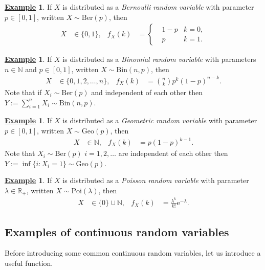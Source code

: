 \documentclass[12pt]{book}
\numberwithin{equation}{chapter}
\theoremstyle{plain}
\numberwithin{theorem}{section}
\theoremstyle{definition}
\newtheorem{example}[theorem]{\underline{Example}}
\numberwithin{exercise}{chapter}
\newcommand{\<}{\langle}
\renewcommand{\>}{\rangle}
\renewcommand{\(}{\left(}
\renewcommand{\)}{\right)}
\renewcommand{\[}{\left[}
\renewcommand{\]}{\right]}
\newcommand\Rb{\mathds{R}}
\newcommand\Nb{\mathds{N}}
\newcommand\lam{\lambda}
\newcommand\ee{\mathrm{e}}
\begin{document}
\begin{example}
\label{ex:bernoulli}
If $X$ is distributed as a \emph{Bernoulli random variable} with parameter $p \in [0,1]$, written $X \sim \text{Ber}(p)$, then
\begin{align}
X
	&\in \{ 0 , 1 \} , &
f_X(k)
	&=	\left\{ \begin{aligned}
			& 1-p & k=0 , \\
			& p & k=1 .
			\end{aligned} \right. 
\end{align}
\end{example}

\begin{example}
\label{ex:binomial}
If $X$ is distributed as a \emph{Binomial random variable} with parameters $n \in \Nb$ and $p \in [0,1]$, written $X \sim \text{Bin}(n,p)$, then
\begin{align}
X
	&\in \{0,1,2,\ldots,n\} , &
f_X(k)
	&=	\binom{n}{k} p^k (1-p)^{n-k} .
\end{align}
Note that if $X_i \sim \text{Ber}(p)$ and independent of each other then $Y := \sum_{i=1}^n X_i \sim \text{Bin}(n,p)$.
\end{example}

\begin{example}
\label{ex:geometric}
If $X$ is distributed as a \emph{Geometric random variable} with parameter $p \in [0,1]$, written $X \sim \text{Geo}(p)$, then
\begin{align}
X
	&\in \Nb , &
f_X(k)
	&=	p (1-p)^{k-1} .
\end{align}
Note that $X_i \sim \text{Ber}(p)$ $i=1,2,\ldots$ are independent of each other then $Y := \inf\{ i : X_i = 1 \} \sim \text{Geo}(p)$.
\end{example}

\begin{example}
\label{ex:poisson}
If $X$ is distributed as a \emph{Poisson random variable} with parameter $\lam \in \Rb_+$, written $X \sim \text{Poi}(\lam)$, then
\begin{align}
X
	&\in \{ 0 \} \cup \Nb , &
f_X(k)
	&=	\frac{\lam^k}{k!}\ee^{-\lam} .
\end{align}
\end{example}

\subsection*{Examples of continuous random variables}

Before introducing some common continuous random variables, let us introduce a useful function.
\end{document}
